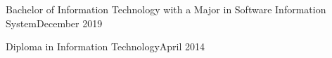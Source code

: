 
\begin{itemize}
    {Bachelor of Information Technology with a Major in Software Information System}{December 2019}
    
    {Diploma in Information Technology}{April 2014}
\end{itemize}

\vspace{4pt}